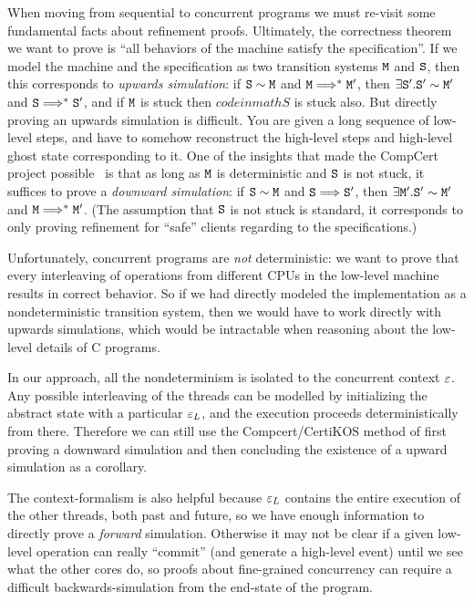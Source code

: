 When moving from sequential to concurrent programs we must
re-visit some fundamental facts about refinement proofs.  Ultimately,
the correctness theorem we want to prove is ``all behaviors of the
machine satisfy the specification''. If we model the machine and the
specification as two transition systems ${\mathrm{\texttt{M}}}$ and ${\mathrm{\texttt{S}}}$, then this
corresponds to \emph{upwards simulation}: if ${\mathrm{\texttt{S}}} \sim {\mathrm{\texttt{M}}}$ and 
${\mathrm{\texttt{M}}} \Longrightarrow^* {\mathrm{\texttt{M}}}'$, then $\exists {\mathrm{\texttt{S}}}'. {\mathrm{\texttt{S}}}' \sim {\mathrm{\texttt{M}}}'$ and
 ${\mathrm{\texttt{S}}} \Longrightarrow^* {\mathrm{\texttt{S}}}'$, and if ${\mathrm{\texttt{M}}}$ is stuck then $codeinmath{S}$ is stuck also.
But directly proving an upwards simulation is difficult. You are given
a long sequence of low-level steps, and have to somehow reconstruct
the high-level steps and high-level ghost state corresponding to
it. One of the insights that made the CompCert project
possible~\cite{Leroy-backend} is that as long as ${\mathrm{\texttt{M}}}$ is deterministic
and ${\mathrm{\texttt{S}}}$ is not stuck, it suffices to prove a \emph{downward
  simulation}: if ${\mathrm{\texttt{S}}} \sim {\mathrm{\texttt{M}}}$ and ${\mathrm{\texttt{S}}} \Longrightarrow {\mathrm{\texttt{S}}}'$, then $\exists
{\mathrm{\texttt{M}}}'. {\mathrm{\texttt{S}}}' \sim {\mathrm{\texttt{M}}}'$ and ${\mathrm{\texttt{M}}} \Longrightarrow^* {\mathrm{\texttt{M}}}'$. (The assumption that ${\mathrm{\texttt{S}}}$
is not stuck is standard, it corresponds to only proving refinement
for ``safe'' clients regarding to the specifications.)

Unfortunately, concurrent programs are \emph{not} deterministic: we
want to prove that every interleaving of operations from
different CPUs in the low-level machine results in correct
behavior. So if we had directly modeled the implementation as a
nondeterministic transition system, then we would have to work
directly with upwards simulations, which would be intractable when
reasoning about the low-level details of C programs.

In our approach, all the nondeterminism is isolated to the concurrent
context ${\varepsilon}$. Any possible interleaving of the threads can be
modelled by initializing the abstract state with a particular
${\varepsilon}_L$, and the execution proceeds deterministically from
there. Therefore we can still use the Compcert/CertiKOS method of first
proving a downward simulation and then concluding the existence of a
upward simulation as a corollary.

The context-formalism is also helpful because ${\varepsilon}_L$ contains
the entire execution of the other threads, both past and future, so we
have enough information to directly prove a \emph{forward}
simulation. Otherwise it may not be clear if a given low-level
operation can really ``commit'' (and generate a high-level event)
until we see what the other cores do, so proofs about fine-grained
concurrency can require a difficult backwards-simulation
from the end-state of the program.~\cite{DGLMQueue}

